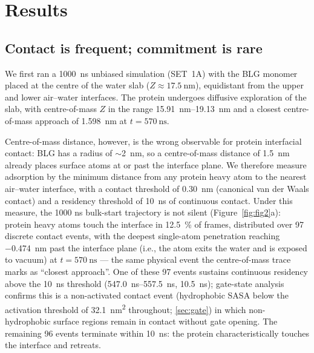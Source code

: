 \documentclass[11pt,a4paper]{article}
\begin{document}
\section{Results}

\subsection{Contact is frequent; commitment is rare}
\label{sec:contact-residency}

We first ran a \SI{1000}{\nano\second} unbiased simulation (SET~1A) with
the BLG monomer placed at the centre of the water slab
($Z \approx \SI{17.5}{\nano\metre}$), equidistant from the upper and lower
air--water interfaces. The protein undergoes diffusive exploration of
the slab, with centre-of-mass $Z$ in the range
\SIrange{15.91}{19.13}{\nano\metre} and a closest centre-of-mass
approach of \SI{1.598}{\nano\metre} at $t = \SI{570}{\nano\second}$.

Centre-of-mass distance, however, is the wrong observable for protein
interfacial contact: BLG has a radius of $\sim$\SI{2}{\nano\metre}, so a
centre-of-mass distance of \SI{1.5}{\nano\metre} already places surface
atoms at or past the interface plane. We therefore measure adsorption by
the minimum distance from any protein heavy atom to the nearest
air--water interface, with a contact threshold of \SI{0.30}{\nano\metre}
(canonical van der Waals contact) and a residency threshold of
\SI{10}{\nano\second} of continuous contact. Under this measure, the
1000 \si{\nano\second} bulk-start trajectory is not silent
(Figure~\ref{fig:fig2}a): protein heavy atoms touch the interface in
\SI{12.5}{\percent} of frames, distributed over \num{97} discrete
contact events, with the deepest single-atom penetration reaching
\SI{-0.474}{\nano\metre} past the interface plane (i.e., the atom
exits the water and is exposed to vacuum) at $t = \SI{570}{\nano\second}$
--- the same physical event the centre-of-mass trace marks as ``closest
approach''. One of these \num{97} events sustains continuous residency above the
\SI{10}{\nano\second} threshold (\SIrange{547.0}{557.5}{\nano\second},
\SI{10.5}{\nano\second}); gate-state analysis confirms this is a
non-activated contact event (hydrophobic SASA below the activation
threshold of \SI{32.1}{\nano\metre\squared} throughout; \cref{sec:gate})
in which non-hydrophobic surface regions remain in contact without gate opening. The remaining \num{96} events terminate
within \SI{10}{\nano\second}: the protein characteristically touches
the interface and retreats.
\end{document}
